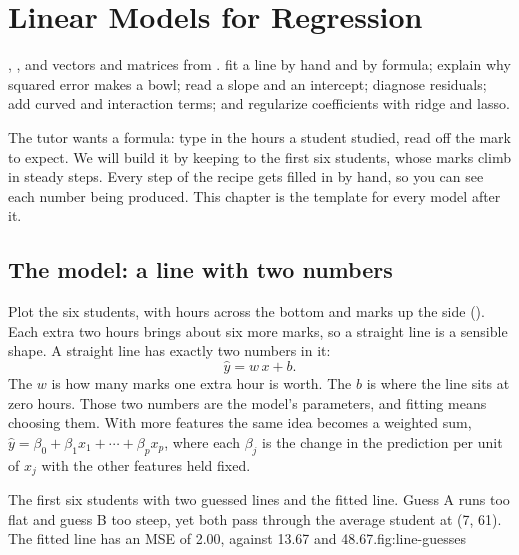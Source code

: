 \chapter{Linear Models for Regression}
\label{ch:regression}

\chapterguide%
  {, , and vectors and matrices from .}
  {fit a line by hand and by formula; explain why squared error makes a bowl; read a slope and an intercept; diagnose residuals; add curved and interaction terms; and regularize coefficients with ridge and lasso.}

The tutor wants a formula: type in the hours a student studied, read off the mark to expect. We will build it by keeping to the first six students, whose marks climb in steady steps. Every step of the recipe gets filled in by hand, so you can see each number being produced. This chapter is the template for every model after it.

\section{The model: a line with two numbers}

Plot the six students, with hours across the bottom and marks up the side (). Each extra two hours brings about six more marks, so a straight line is a sensible shape. A straight line has exactly two numbers in it:
\[
  \hat{y}=w\,x+b.
\]
The  $w$ is how many marks one extra hour is worth. The  $b$ is where the line sits at zero hours. Those two numbers are the model's parameters, and fitting means choosing them. With more features the same idea becomes a weighted sum, $\hat{y}=\beta_0+\beta_1x_1+\cdots+\beta_{p}x_{p}$, where each $\beta_j$ is the change in the prediction per unit of $x_j$ with the other features held fixed.

\begin{utpfig}{The first six students with two guessed lines and the fitted line. Guess A runs too flat and guess B too steep, yet both pass through the average student at (7, 61). The fitted line has an MSE of 2.00, against 13.67 and 48.67.}{fig:line-guesses}
\end{utpfig}

